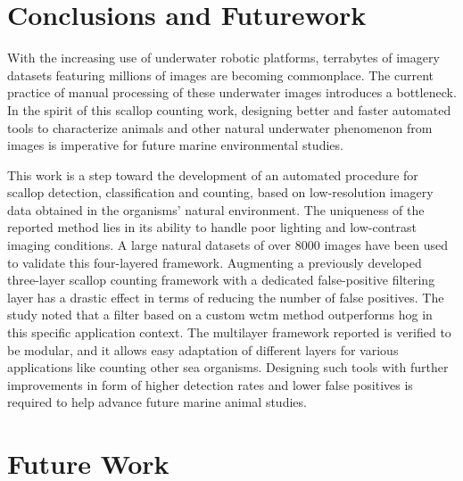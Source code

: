 \section{Conclusions and Futurework}

With the increasing use of underwater robotic platforms, terrabytes of imagery datasets featuring millions of images are becoming commonplace. 
The current practice of manual processing of these underwater images introduces a bottleneck. 
In the spirit of this scallop counting work, designing better and faster automated tools  to characterize animals and other natural underwater phenomenon from images is imperative for future marine environmental studies.

This work is a step toward
the development of an automated procedure for scallop detection, classification
and counting, based on low-resolution imagery data obtained in the organisms' natural environment.
The uniqueness of the reported method lies in its ability to handle poor lighting and low-contrast imaging conditions.
A large natural datasets of over 8000 images have been used to validate this four-layered framework.
Augmenting a previously developed three-layer scallop counting framework with a dedicated false-positive filtering layer has a drastic effect in terms of reducing the number of false positives.
The study noted that a filter based on a custom \gls{wctm} method outperforms \gls{hog} in  this specific application context. 
The multilayer framework reported is verified to be modular, and it allows easy adaptation of different layers for various applications like counting other sea organisms. 
Designing such tools with further improvements in form of higher detection rates and lower false positives is required to help advance future marine animal studies.

\section{Future Work}

